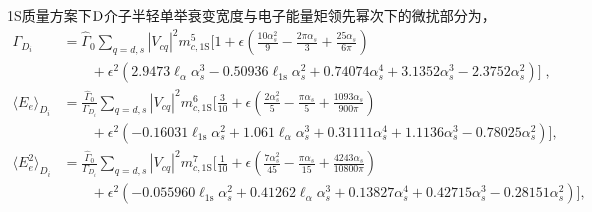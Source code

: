 1S质量方案下$\mathrm{D}$介子半轻单举衰变宽度与电子能量矩领先幂次下的微扰部分为，
\begin{equation}
    \begin{aligned}
        \Gamma_{D_{i}}&=\hat{\Gamma}_0 \sum_{q=d,s}\left|V_{cq}\right|^2 m_{c,\mathrm{1S}}^5 \Big[1+\epsilon  \left(\frac{10 \alpha _s^2}{9}-\frac{2 \pi \alpha _s}{3}+\frac{25 \alpha _s}{6 \pi }\right)\\
           & \qquad+\epsilon
           ^2 \left(2.9473 \ell_{\alpha} \alpha _s^3-0.50936
           \ell_{\text{1s}} \alpha _s^2+0.74074 \alpha _s^4+3.1352 \alpha
           _s^3-2.3752 \alpha _s^2\right) \Big] \; , \nonumber  \\
        \langle E_{e}\rangle_{D_{i}}&=\frac{\hat{\Gamma}_0}{    \Gamma_{D_{i}}}\sum_{q=d,s} \left|V_{cq}\right|^2 m_{c,\mathrm{1S}}^6 \Big[ \frac{3}{10}+\epsilon  \left(\frac{2 \alpha_s^2}{5}-\frac{\pi  \alpha _s}{5}+\frac{1093 \alpha_s}{900 \pi }\right)\nonumber \\
           & \qquad +\epsilon ^2 \left(-0.16031 \ell_{\text{1s}} \alpha_s^2+1.061 \ell_{\alpha} \alpha_s^3+0.31111 \alpha _s^4+1.1136 \alpha _s^3-0.78025 \alpha_s^2\right)  \Big],\nonumber \\
        \langle E_{e}^{2} \rangle_{D_{i}} &=\frac{\hat{\Gamma}_0}{\Gamma_{D_{i}}} \sum_{q=d,s}\left|V_{cq}\right|^2 m_{c,\mathrm{1S}}^7 \Big[ \frac{1}{10}+\epsilon  \left(\frac{7 \alpha_s^2}{45}-\frac{\pi  \alpha _s}{15}+\frac{4243 \alpha_s}{10800 \pi }\right)\nonumber \\
           & \qquad +\epsilon ^2 \left(-0.055960 \ell_{\text{1s}} \alpha_s^2+0.41262 \ell_{\alpha} \alpha_s^3+0.13827 \alpha_s^4+0.42715 \alpha _s^3-0.28151 \alpha _s^2\right)  \Big], \nonumber \\
    \end{aligned}
    \label{eq:1s-leading}
\end{equation}
